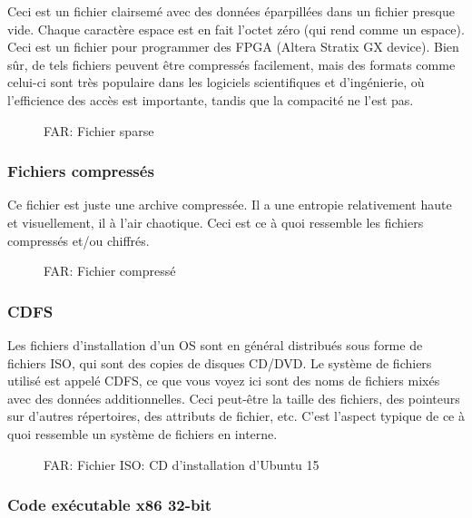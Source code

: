 Ceci est un fichier clairsemé avec des données éparpillées dans un fichier presque vide.
Chaque caractère espace est en fait l'octet zéro (qui rend comme un espace).
Ceci est un fichier pour programmer des FPGA (Altera Stratix GX device).
Bien sûr, de tels fichiers peuvent être compressés facilement, mais des formats comme
celui-ci sont très populaire dans les logiciels scientifiques et d'ingénierie, où
l'efficience des accès est importante, tandis que la compacité ne l'est pas.

\begin{figure}[H]
\centering
{}
\caption{FAR: Fichier sparse}
\end{figure}

\clearpage
\subsubsection{Fichiers compressés}

Ce fichier est juste une archive compressée.
Il a une entropie relativement haute et visuellement, il à l'air chaotique.
Ceci est ce à quoi ressemble les fichiers compressés et/ou chiffrés.

\begin{figure}[H]
\centering
{}
\caption{FAR: Fichier compressé}
\end{figure}

\clearpage
\subsubsection{\ac{CDFS}}

Les fichiers d'installation d'un \ac{OS} sont en général distribués sous forme de
fichiers ISO, qui sont des copies de disques CD/DVD.
Le système de fichiers utilisé est appelé \ac{CDFS}, ce que vous voyez ici sont des
noms de fichiers mixés avec des données additionnelles.
Ceci peut-être la taille des fichiers, des pointeurs sur d'autres répertoires, des
attributs de fichier, etc.
C'est l'aspect typique de ce à quoi ressemble un système de fichiers en interne.

\begin{figure}[H]
\centering
{}
\caption{FAR: Fichier ISO: \ac{CD} d'installation d'Ubuntu 15}
\end{figure}

\clearpage
\subsubsection{Code exécutable x86 32-bit}

